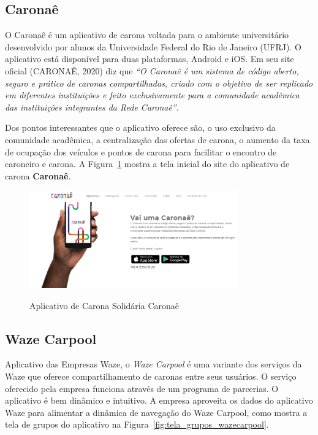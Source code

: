 \subsection{Caronaê}


O Caronaê é um aplicativo de carona voltada para o ambiente universitário desenvolvido por alunos da Universidade Federal do Rio de Janeiro (UFRJ). O aplicativo está disponível para duas plataformas, Android e iOS. Em seu site oficial (CARONAÊ, 2020) diz que \textit{“O Caronaê é um sistema de código aberto, seguro e prático de caronas compartilhadas, criado com o objetivo de ser replicado em diferentes instituições e feito exclusivamente para a comunidade acadêmica das instituições integrantes da Rede Caronaê”}.

Dos pontos interessantes que o aplicativo oferece são, o uso exclusivo da comunidade acadêmica, a centralização das ofertas de carona, o aumento da taxa de ocupação dos veículos e pontos de carona para facilitar o encontro de caroneiro e carona. A Figura~\ref{fig:caronae} mostra a tela inicial do site do aplicativo de carona \textbf{Caronaê}.

\begin{figure}[!hbtp]
	\centering
	\caption{Aplicativo de Carona Solidária Caronaê}
	\includegraphics[width=0.8\textwidth]{./04-figuras/caronae.png}
	\label{fig:caronae}
\end{figure}



\subsection{Waze Carpool}
Aplicativo das Empresas Waze, o \textit{Waze Carpool} é uma variante dos serviços da Waze que oferece compartilhamento de caronas entre seus usuários. O serviço oferecido pela empresa funciona através de um programa de parcerias. O aplicativo é bem dinâmico e intuitivo. A empresa aproveita os dados do aplicativo Waze para alimentar a dinâmica de navegação do Waze Carpool, como mostra a tela de grupos do aplicativo na Figura~\ref{fig:tela_grupos_wazecarpool}.

